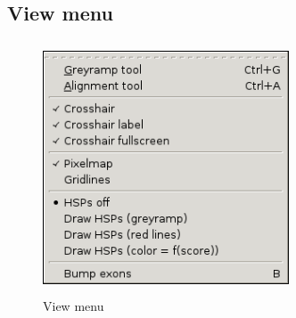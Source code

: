 \documentclass{report}
\begin{document}
{ \color[rgb]{0.30980393,0.5058824,0.7411765}\subsection[View menu]{View menu}}

\begin{figure}
 \centering
 \color[rgb]{0.30980393,0.5058824,0.7411765}
 \includegraphics[width=7.303cm,height=7.454cm]{img_menu_view.png}
 \caption{View menu}
\end{figure}
\end{document}
